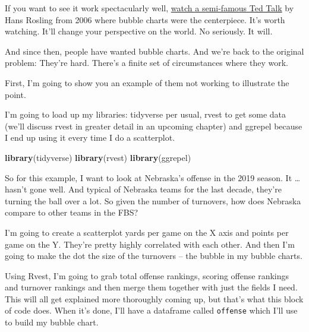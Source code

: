 \documentclass[]{book}
\newenvironment{Shaded}{\begin{snugshade}}{\end{snugshade}}
\newcommand{\KeywordTok}[1]{\textcolor[rgb]{0.13,0.29,0.53}{\textbf{#1}}}
\newcommand{\NormalTok}[1]{#1}
\begin{document}
If you want to see it work spectacularly well, \href{https://www.youtube.com/watch?v=hVimVzgtD6w}{watch a semi-famous Ted Talk} by Hans Rosling from 2006 where bubble charts were the centerpiece. It's worth watching. It'll change your perspective on the world. No seriously. It will.

And since then, people have wanted bubble charts. And we're back to the original problem: They're hard. There's a finite set of circumstances where they work.

First, I'm going to show you an example of them not working to illustrate the point.

I'm going to load up my libraries: tidyverse per usual, rvest to get some data (we'll discuss rvest in greater detail in an upcoming chapter) and ggrepel because I end up using it every time I do a scatterplot.

\begin{Shaded}
\begin{Highlighting}[]
\KeywordTok{library}\NormalTok{(tidyverse)}
\KeywordTok{library}\NormalTok{(rvest)}
\KeywordTok{library}\NormalTok{(ggrepel)}
\end{Highlighting}
\end{Shaded}

So for this example, I want to look at Nebraska's offense in the 2019 season. It \ldots{} hasn't gone well. And typical of Nebraska teams for the last decade, they're turning the ball over a lot. So given the number of turnovers, how does Nebraska compare to other teams in the FBS?

I'm going to create a scatterplot yards per game on the X axis and points per game on the Y. They're pretty highly correlated with each other. And then I'm going to make the dot the size of the turnovers -- the bubble in my bubble charts.

Using Rvest, I'm going to grab total offense rankings, scoring offense rankings and turnover rankings and then merge them together with just the fields I need. This will all get explained more thoroughly coming up, but that's what this block of code does. When it's done, I'll have a dataframe called \texttt{offense} which I'll use to build my bubble chart.
\end{document}
